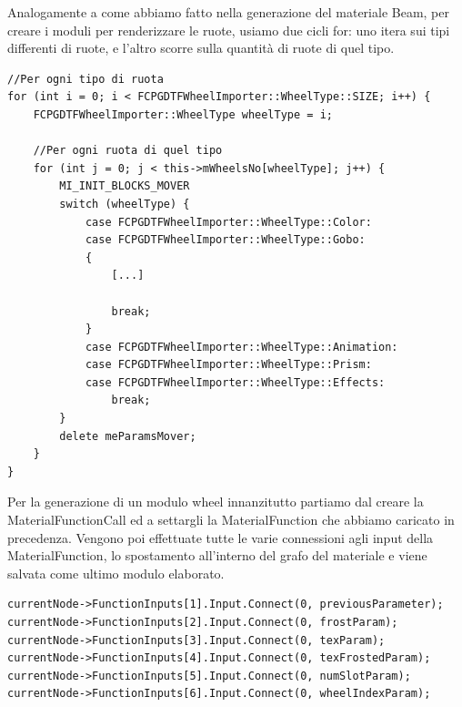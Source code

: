 \documentclass[main.tex]{subfiles}
\begin{document}
Analogamente a come abbiamo fatto nella generazione del materiale Beam, per creare i moduli per renderizzare le ruote, usiamo due cicli for: uno itera sui tipi differenti di ruote, e l'altro scorre sulla quantità di ruote di quel tipo. 
\begin{lstlisting}
//Per ogni tipo di ruota
for (int i = 0; i < FCPGDTFWheelImporter::WheelType::SIZE; i++) {
    FCPGDTFWheelImporter::WheelType wheelType = i;

    //Per ogni ruota di quel tipo
    for (int j = 0; j < this->mWheelsNo[wheelType]; j++) {
        MI_INIT_BLOCKS_MOVER
        switch (wheelType) {
            case FCPGDTFWheelImporter::WheelType::Color:
            case FCPGDTFWheelImporter::WheelType::Gobo:
            {
                [...]
                
                break;
            }
            case FCPGDTFWheelImporter::WheelType::Animation:
            case FCPGDTFWheelImporter::WheelType::Prism:
            case FCPGDTFWheelImporter::WheelType::Effects:
                break;
        }
        delete meParamsMover;
    }
}
\end{lstlisting}
Per la generazione di un modulo wheel innanzitutto partiamo dal creare la MaterialFunctionCall ed a settargli la MaterialFunction che abbiamo caricato in precedenza.
Vengono poi effettuate tutte le varie connessioni agli input della MaterialFunction, lo spostamento all'interno del grafo del materiale e viene salvata come ultimo modulo elaborato. 
\begin{lstlisting}
currentNode->FunctionInputs[1].Input.Connect(0, previousParameter);
currentNode->FunctionInputs[2].Input.Connect(0, frostParam);
currentNode->FunctionInputs[3].Input.Connect(0, texParam);
currentNode->FunctionInputs[4].Input.Connect(0, texFrostedParam);
currentNode->FunctionInputs[5].Input.Connect(0, numSlotParam);
currentNode->FunctionInputs[6].Input.Connect(0, wheelIndexParam);
\end{lstlisting}
\end{document}
